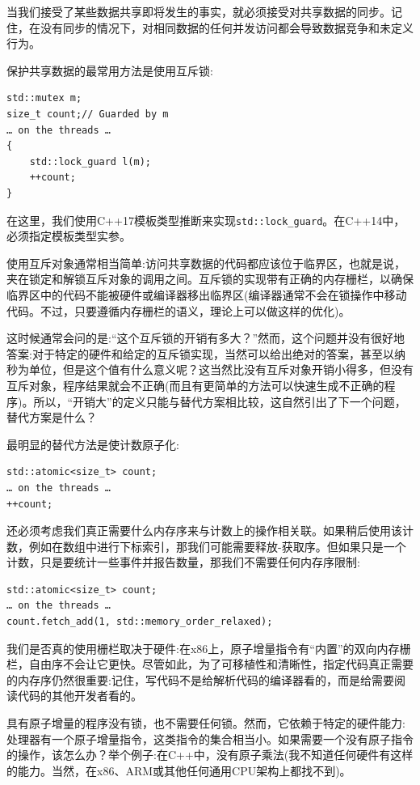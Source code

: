 
当我们接受了某些数据共享即将发生的事实，就必须接受对共享数据的同步。记住，在没有同步的情况下，对相同数据的任何并发访问都会导致数据竞争和未定义行为。

保护共享数据的最常用方法是使用互斥锁:

\begin{lstlisting}[style=styleCXX]
std::mutex m;
size_t count;// Guarded by m
… on the threads …
{
	std::lock_guard l(m);
	++count;
}
\end{lstlisting}

在这里，我们使用C++17模板类型推断来实现\texttt{std::lock\_guard}。在C++14中，必须指定模板类型实参。

使用互斥对象通常相当简单:访问共享数据的代码都应该位于临界区，也就是说，夹在锁定和解锁互斥对象的调用之间。互斥锁的实现带有正确的内存栅栏，以确保临界区中的代码不能被硬件或编译器移出临界区(编译器通常不会在锁操作中移动代码。不过，只要遵循内存栅栏的语义，理论上可以做这样的优化)。

这时候通常会问的是:“这个互斥锁的开销有多大？”然而，这个问题并没有很好地答案:对于特定的硬件和给定的互斥锁实现，当然可以给出绝对的答案，甚至以纳秒为单位，但是这个值有什么意义呢？这当然比没有互斥对象开销小得多，但没有互斥对象，程序结果就会不正确(而且有更简单的方法可以快速生成不正确的程序)。所以，“开销大”的定义只能与替代方案相比较，这自然引出了下一个问题，替代方案是什么？

最明显的替代方法是使计数原子化:

\begin{lstlisting}[style=styleCXX]
std::atomic<size_t> count;
… on the threads …
++count;
\end{lstlisting}

还必须考虑我们真正需要什么内存序来与计数上的操作相关联。如果稍后使用该计数，例如在数组中进行下标索引，那我们可能需要释放-获取序。但如果只是一个计数，只是要统计一些事件并报告数量，那我们不需要任何内存序限制:

\begin{lstlisting}[style=styleCXX]
std::atomic<size_t> count;
… on the threads …
count.fetch_add(1, std::memory_order_relaxed);
\end{lstlisting}

我们是否真的使用栅栏取决于硬件:在x86上，原子增量指令有“内置”的双向内存栅栏，自由序不会让它更快。尽管如此，为了可移植性和清晰性，指定代码真正需要的内存序仍然很重要:记住，写代码不是给解析代码的编译器看的，而是给需要阅读代码的其他开发者看的。

具有原子增量的程序没有锁，也不需要任何锁。然而，它依赖于特定的硬件能力:处理器有一个原子增量指令，这类指令的集合相当小。如果需要一个没有原子指令的操作，该怎么办？举个例子:在C++中，没有原子乘法(我不知道任何硬件有这样的能力。当然，在x86、ARM或其他任何通用CPU架构上都找不到)。

